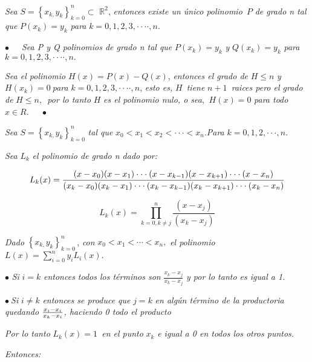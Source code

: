 \documentclass{article}
\begin{document}
\textit{Sea }$S=\left\{ x_{k,}y_{k}\right\} _{k=0}^{n}\subset $ $%
\mathbb{R}
^{2}$, \emph{entonces existe un \'{u}nico polinomio}\textit{\ }$P$ \textit{%
de grado n tal que }$P(x_{k})=y_{k}$ \textit{para }$k=0,1,2,3,\cdot \cdot
\cdot \cdot ,n$.

$\bullet $ \ $\ \ \ $\textit{Sea P y Q polinomios de grado n tal que }$%
P(x_{k})=y_{k}$ \textit{y }$Q(x_{k})=y_{k}$ \textit{para }$k=0,1,2,3,\cdot
\cdot \cdot \cdot ,n.$

\textit{Sea el polinomio }$H(x)=P(x)-Q(x)$, \textit{entonces el grado de }$%
H\leq n$ \textit{y }$H(x_{k})=0\mathit{\ }$\textit{para }$k=0,1,2,3,\cdot
\cdot \cdot \cdot ,n$, \textit{esto es, }$H$\textit{\ tiene }$n+1$\textit{\
raices pero el grado de }$H\leq n,$\textit{\ por lo tanto} $H$ \textit{es el
polinomio nulo, o sea}, $\ H(x)=0$ \textit{para todo} $x\in R$. $\ \ \ \ \
\bullet $

\textit{Sea }$S=\left\{ x_{k,}y_{k}\right\} _{k=0}^{n}$ \textit{tal que} $%
x_{0}<x_{1}<x_{2}<\cdot \cdot \cdot <x_{n}.$\textit{Para }$k=0,1,2,\cdot
\cdot \cdot ,n.$

\textit{Sea} $L_{k}$ \textit{el polinomio de grado n dado por:}

\[
L_{k}(x)=\frac{(x-x_{0})(x-x_{1})\cdot \cdot \cdot
(x-x_{k-1})(x-x_{k+1})\cdot \cdot \cdot (x-x_{n})}{%
(x_{k}-x_{0})(x_{k}-x_{1})\cdot \cdot \cdot
(x_{k}-x_{k-1})(x_{k}-x_{k+1})\cdot \cdot \cdot (x_{k}-x_{n})} 
\]

\[
L_{k}(x)=\prod\limits_{k=0,k\neq j}^{n}\frac{(x-x_{j})}{(x_{k}-x_{j})} 
\]

\textit{Dado }$\left\{ x_{k,}y_{k}\right\} _{k=0}^{n}\,$, \textit{con }$%
x_{0}<x_{1}<\cdots <x_{n},$ \textit{el polinomio }$L(x)=\sum%
\limits_{i=0}^{n}y_{i}L_{i}(x).$

$\bullet $ \textit{Si }$i=k$ \textit{entonces todos los t\'{e}rminos son }$%
\frac{x_{k}-x_{j}}{x_{k}-x_{j}}$ \textit{y por lo tanto es igual a 1.}

$\bullet \mathit{\ }$\textit{Si }$i\neq k$ \textit{entonces se produce que} $%
j=k$ \textit{en alg\'{u}n t\'{e}rmino de la productoria quedando }$\frac{%
x_{i}-x_{i}}{x_{k}-x_{i}}$\textit{, haciendo 0 todo el producto}

\textit{Por lo tanto} $L_{k}(x)=1$\textit{\ en el punto }$x_{k}$ \textit{e
igual a 0 en todos los otros puntos.}

\textit{Entonces: }

\bigskip {}
\end{document}
